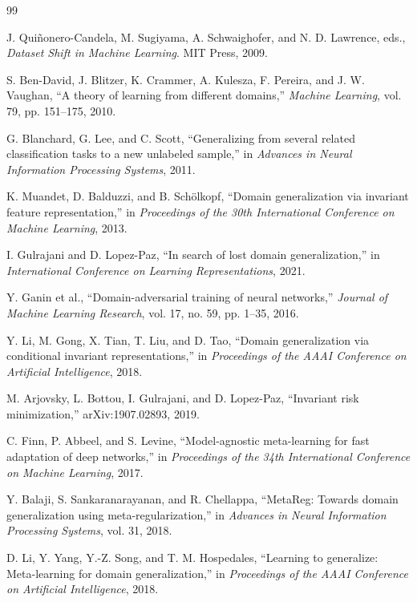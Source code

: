 \documentclass[11pt,a4paper]{article}
\begin{document}
\begin{thebibliography}{99}

J. Qui\~nonero-Candela, M. Sugiyama, A. Schwaighofer, and N. D. Lawrence, eds.,
\emph{Dataset Shift in Machine Learning}. MIT Press, 2009.

S. Ben-David, J. Blitzer, K. Crammer, A. Kulesza, F. Pereira, and J. W. Vaughan,
``A theory of learning from different domains,'' \emph{Machine Learning}, vol. 79, pp. 151--175, 2010.

G. Blanchard, G. Lee, and C. Scott,
``Generalizing from several related classification tasks to a new unlabeled sample,''
in \emph{Advances in Neural Information Processing Systems}, 2011.

K. Muandet, D. Balduzzi, and B. Sch\"olkopf,
``Domain generalization via invariant feature representation,''
in \emph{Proceedings of the 30th International Conference on Machine Learning}, 2013.

I. Gulrajani and D. Lopez-Paz,
``In search of lost domain generalization,''
in \emph{International Conference on Learning Representations}, 2021.

Y. Ganin et al.,
``Domain-adversarial training of neural networks,''
\emph{Journal of Machine Learning Research}, vol. 17, no. 59, pp. 1--35, 2016.

Y. Li, M. Gong, X. Tian, T. Liu, and D. Tao,
``Domain generalization via conditional invariant representations,''
in \emph{Proceedings of the AAAI Conference on Artificial Intelligence}, 2018.

M. Arjovsky, L. Bottou, I. Gulrajani, and D. Lopez-Paz,
``Invariant risk minimization,'' arXiv:1907.02893, 2019.

C. Finn, P. Abbeel, and S. Levine,
``Model-agnostic meta-learning for fast adaptation of deep networks,''
in \emph{Proceedings of the 34th International Conference on Machine Learning}, 2017.

Y. Balaji, S. Sankaranarayanan, and R. Chellappa,
``MetaReg: Towards domain generalization using meta-regularization,''
in \emph{Advances in Neural Information Processing Systems}, vol. 31, 2018.

D. Li, Y. Yang, Y.-Z. Song, and T. M. Hospedales,
``Learning to generalize: Meta-learning for domain generalization,''
in \emph{Proceedings of the AAAI Conference on Artificial Intelligence}, 2018.


\end{thebibliography}
\end{document}
